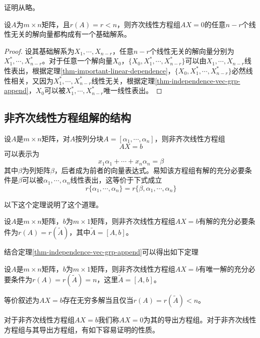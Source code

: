 证明从略。

\begin{example}
    设$A$为$m\times n$矩阵，且$r(A)=r<n$，则齐次线性方程组$AX=0$的任意$n-r$个线性无关的解向量都构成有一个基础解系。
\end{example}

\begin{proof}
    设其基础解系为$X_1,\cdots,X_{n-r}$，任意$n-r$个线性无关的解向量分别为$X_1^*,\cdots,X_{n-r}^*$。对于任意一个解向量$X_0$，$\{X_0,X_1^*,\cdots,X_{n-r}^*\}$可以由$X_1,\cdots,X_{n-r}$线性表出，根据定理\ref{thm-important-linear-dependence}，$\{X_0,X_1^*,\cdots,X_{n-r}^*\}$必然线性相关，又因为$X_1^*,\cdots,X_{n-r}^*$线性无关，根据定理\ref{thm-independence-vec-grp-append}，$X_0$可以被$X_1^*,\cdots,X_{n-r}^*$唯一线性表出。
\end{proof}

\subsection{非齐次线性方程组解的结构}

设$A$是$m\times n$矩阵，对$A$按列分块$A=[\alpha_1,\cdots,\alpha_n]$，则非齐次线性方程组
\[
    AX=b
\]
可以表示为
\[
    x_1\alpha_1+\cdots+x_n\alpha_n=\beta
\]
其中$\beta$为列矩阵$\beta$，后者成为前者的向量表达式。易知该方程组有解的充分必要条件是$\beta$可以被$\alpha_1,\cdots,\alpha_n$线性表出，这等价于下式成立
\[
    r\{\alpha_1,\cdots,\alpha_n\}=r\{\beta,\alpha_1,\cdots,\alpha_n\}
\]

以下这个定理说明了这个道理。

\begin{thm}
    \label{thm-not-homo-equations-solvable}
    设$A$是$m\times n$矩阵，$b$为$m\times 1$矩阵，则非齐次线性方程组$AX=b$有解的充分必要条件为$r(A)=r(\tilde{A})$，其中$\tilde{A}=[A,b]$。
\end{thm}

结合定理\ref{thm-independence-vec-grp-append}可以得出如下定理

\begin{thm}
    \label{thm-not-homo-equations-single-solution}
    设$A$是$m\times n$矩阵，$b$为$m\times 1$矩阵，则非齐次线性方程组$AX=b$有唯一解的充分必要条件为$r(A)=r(\tilde{A})=n$，这里$\tilde{A}=[A,b]$。

    等价叙述为$AX=b$存在无穷多解当且仅当$r(A)=r(\tilde{A})<n$。
\end{thm}

对于非齐次线性方程组$AX=b$我们称$AX=0$为其的导出方程组。对于非齐次线性方程组与其导出方程组，有如下容易证明的性质。

